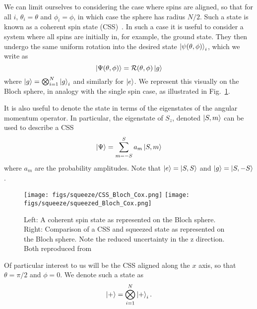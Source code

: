 We can limit ourselves to considering the case where spins are aligned,
so that for all $i$, $\theta_i = \theta$ and $\phi_i = \phi$, in which case the
sphere has radius $N/2$. Such a state is known as a coherent spin state
(CSS)~\cite{MA201189, Gazeau2009}. In such a case it is useful to consider a system where
all spins are initially in, for example, the ground state. They then undergo
the same uniform rotation into the desired state $\ket{\psi(\theta, \phi)}_i$,
which we write as
%
\begin{equation}
  \ket{\Psi(\theta,\phi)} = \mathcal{R}(\theta, \phi)\ket{g}
\end{equation}
%
where $\ket{g} = \bigotimes_{i=1}^N\ket{g}_i$ and similarly for $\ket{e}$. We
represent this visually on the Bloch sphere, in analogy with the single spin
case, as illustrated in Fig.~\ref{CSSbloch}. 

It is also useful to denote the state in terms of the
eigenstates of the angular momentum operator. In particular, the eigenstate of
$S_z$, denoted $\ket{S, m}$ can be used to describe a CSS
%
\begin{equation}
  \ket{\Psi} = \sum_{m=-S}^S a_m \ket{S, m}
\end{equation}
where $a_m$ are the probability amplitudes. Note that $\ket{e} = \ket{S, S}$
and $\ket{g} = \ket{S, -S}$.

\begin{figure}
  \centering
  \texttt{[image: figs/squeeze/CSS\_Bloch\_Cox.png]}
  \texttt{[image: figs/squeeze/squeezed\_Bloch\_Cox.png]}
  \caption{Left: A coherent spin state as represented on the Bloch sphere.
  Right: Comparison of a CSS and squeezed state as represented on the Bloch
  sphere. Note the reduced uncertainty in the z direction.
  Both reproduced from~\cite{Cox2016}}
  \label{CSSbloch}
\end{figure}

Of particular interest to us will be the CSS aligned along the $x$ axis, so
that $\theta = \pi/2$ and $\phi = 0$. We denote such a state as
%
\begin{equation}
  \ket{+} = \bigotimes_{i=1}^N \ket{+}_i.
\end{equation}

